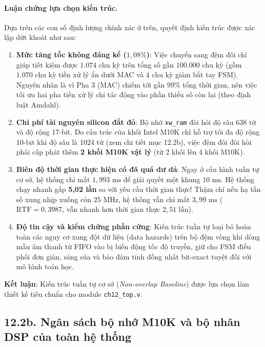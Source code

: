 \paragraph{Luận chứng lựa chọn kiến trúc.}
Dựa trên các con số định lượng chính xác ở trên, quyết định kiến trúc được xác lập dứt khoát như sau:
\begin{enumerate}
    \item \textbf{Mức tăng tốc không đáng kể ($1{,}08\%$)}: Việc chuyển sang đệm đôi chỉ giúp tiết kiệm được $1.074\text{ chu kỳ}$ trên tổng số gần $100.000\text{ chu kỳ}$ (gồm $1.070\text{ chu kỳ}$ tiền xử lý ẩn dưới MAC và $4\text{ chu kỳ}$ giảm bắt tay FSM). Nguyên nhân là vì Pha 3 (MAC) chiếm tới gần $99\%$ tổng thời gian, nên việc tối ưu hai pha tiền xử lý chỉ tác động vào phần thiểu số còn lại (theo định luật Amdahl).
    \item \textbf{Chi phí tài nguyên silicon đắt đỏ}: Bộ nhớ \texttt{xw\_ram} đòi hỏi độ sâu 638 từ và độ rộng 17-bit. Do cấu trúc của khối Intel M10K chỉ hỗ trợ tối đa độ rộng 10-bit khi độ sâu là 1024 từ (xem chi tiết mục 12.2b), việc đệm đôi đòi hỏi phải cấp phát thêm \textbf{2 khối M10K vật lý} (từ 2 khối lên 4 khối M10K).
    \item \textbf{Biên độ thời gian thực hiện có đã quá dư dả}: Ngay ở cấu hình tuần tự cơ sở, hệ thống chỉ mất $1{,}993\text{ ms}$ để giải quyết một khung $10\text{ ms}$. Hệ thống chạy nhanh gấp \textbf{5,02 lần} so với yêu cầu thời gian thực! Thậm chí nếu hạ tần số xung nhịp xuống còn $25\text{ MHz}$, hệ thống vẫn chỉ mất $3{,}99\text{ ms}$ ($\text{RTF} = 0{,}3987$, vẫn nhanh hơn thời gian thực $2{,}51\text{ lần}$).
    \item \textbf{Độ tin cậy và kiểm chứng phần cứng}: Kiến trúc tuần tự loại bỏ hoàn toàn các nguy cơ xung đột dữ liệu (data hazards) trên bộ đệm vòng khi dòng mẫu âm thanh từ FIFO vào bị biến động tốc độ truyền, giữ cho FSM điều phối đơn giản, sáng sủa và bảo đảm tính đồng nhất bit-exact tuyệt đối với mô hình toán học.
\end{enumerate}

\textbf{Kết luận}: Kiến trúc tuần tự cơ sở (\emph{Non-overlap Baseline}) được lựa chọn làm thiết kế tiêu chuẩn cho module \texttt{ch12\_top.v}.

\subsection*{12.2b. Ngân sách bộ nhớ M10K và bộ nhân DSP của toàn hệ thống}

